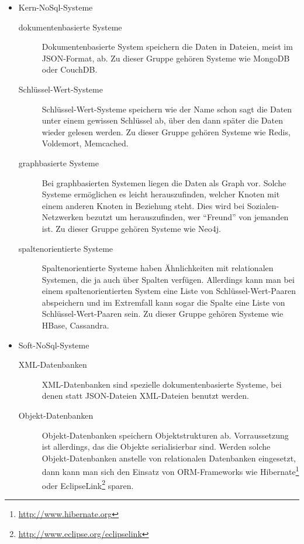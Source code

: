\begin{itemize}
    \item Kern-NoSql-Systeme
        \begin{description}
            \item[dokumentenbasierte Systeme] Dokumentenbasierte System
                speichern die Daten in Dateien, meist im \gls{JSON}-Format, ab.
                Zu dieser Gruppe gehören Systeme wie MongoDB oder CouchDB.
            \item[Schlüssel-Wert-Systeme] Schlüssel-Wert-Systeme speichern wie
                der Name schon sagt die Daten unter einem gewissen Schlüssel ab,
                über den dann später die Daten wieder gelesen werden. Zu dieser
                Gruppe gehören Systeme wie Redis, Voldemort, Memcached.
            \item[graphbasierte Systeme] Bei graphbasierten Systemen liegen die
                Daten als Graph vor. Solche Systeme ermöglichen es leicht
                herauszufinden, welcher Knoten mit einem anderen Knoten in
                Beziehung steht. Dies wird bei Sozialen-Netzwerken bezutzt um
                herauszufinden, wer \enquote{Freund} von jemanden ist. Zu
                dieser Gruppe gehören Systeme wie Neo4j.
            \item[spaltenorientierte Systeme] Spaltenorientierte Systeme haben
                Ähnlichkeiten mit relationalen Systemen, die ja auch über
                Spalten verfügen. Allerdings kann man bei einem
                spaltenorientierten System eine Liste von Schlüssel-Wert-Paaren
                abspeichern und im Extremfall kann sogar die Spalte eine Liste
                von Schlüssel-Wert-Paaren sein. Zu dieser Gruppe gehören Systeme
                wie HBase, Cassandra.
        \end{description}
    \item Soft-NoSql-Systeme
        \begin{description}
            \item[XML-Datenbanken] XML-Datenbanken sind spezielle
                dokumentenbasierte Systeme, bei denen statt \gls{JSON}-Dateien
                \gls{XML}-Dateien benutzt werden.
            \item[Objekt-Datenbanken] Objekt-Datenbanken speichern
                Objektstrukturen ab. Vorraussetzung ist allerdings, das die
                Objekte serialisierbar sind. Werden solche Objekt-Datenbanken
                anstelle von relationalen Datenbanken eingesetzt, dann kann man
                sich den Einsatz von \gls{ORM}-Frameworks wie
                Hibernate\footnote{\url{http://www.hibernate.org}}
                oder EclipseLink\footnote{\url{http://www.eclipse.org/eclipselink}}
                sparen.
        \end{description}
\end{itemize}


